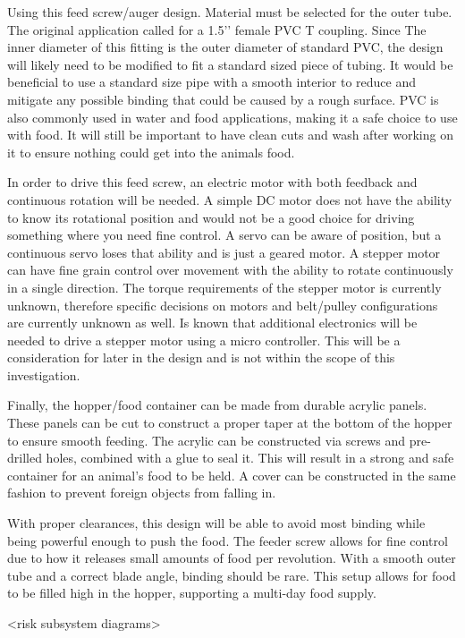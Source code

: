 \documentclass[12pt]{article}
\begin{document}
Using this feed screw/auger design. Material must be selected for the outer tube. The original application called for a 1.5’’ female PVC T coupling. Since The inner diameter of this fitting is the outer diameter of standard PVC, the design will likely need to be modified to fit a standard sized piece of tubing. It would be beneficial to use a standard size pipe with a smooth interior to reduce and mitigate any possible binding that could be caused by a rough surface. PVC is also commonly used in water and food applications, making it a safe choice to use with food. It will still be important to have clean cuts and wash after working on it to ensure nothing could get into the animals food. 

In order to drive this feed screw, an electric motor with both feedback and continuous rotation will be needed. A simple DC motor does not have the ability to know its rotational position and would not be a good choice for driving something where you need fine control. A servo can be aware of position, but a continuous servo loses that ability and is just a geared motor. A stepper motor can have fine grain control over movement with the ability to rotate continuously in a single direction. The torque requirements of the stepper motor is currently unknown, therefore specific decisions on motors and belt/pulley configurations are currently unknown as well. Is known that additional electronics will be needed to drive a stepper motor using a micro controller. This will be a consideration for later in the design and is not within the scope of this investigation. 

Finally, the hopper/food container can be made from durable acrylic panels. These panels can be cut to construct a proper taper at the bottom of the hopper to ensure smooth feeding.  The acrylic can be constructed via screws and pre-drilled holes, combined with a glue to seal it. This will result in a strong and safe container for an animal’s food to be held. A cover can be constructed in the same fashion to prevent foreign objects from falling in. 

 With proper clearances, this design will be able to avoid most binding while being powerful enough to push the food. The feeder screw allows for fine control due to how it releases small amounts of food per revolution. With a smooth outer tube and a correct blade angle, binding should be rare. This setup allows for food to be filled high in the hopper, supporting a multi-day food supply. 

<risk subsystem diagrams>
\end{document}
